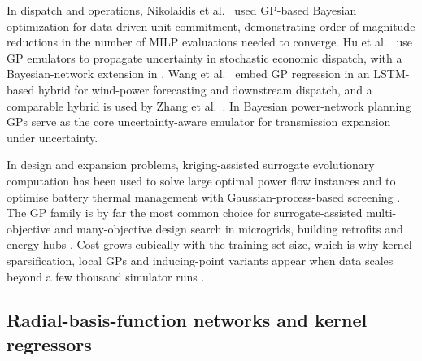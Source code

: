 In dispatch and operations, Nikolaidis et
al.~\cite{Nikolaidis2021} used GP-based Bayesian optimization for
data-driven unit commitment, demonstrating order-of-magnitude
reductions in the number of MILP evaluations needed to converge.
Hu et al.~\cite{Hu2020,Hu2021671} use GP emulators to propagate
uncertainty in stochastic economic dispatch, with a Bayesian-network
extension in \cite{Volodina2022}. Wang et al.~\cite{Wang2023} embed
GP regression in an LSTM-based hybrid for wind-power forecasting and
downstream dispatch, and a comparable hybrid is used by Zhang et
al.~\cite{Zhang2019270}. In Bayesian power-network planning
\cite{Lawson201647} GPs serve as the core uncertainty-aware emulator
for transmission expansion under uncertainty.

In design and expansion problems, kriging-assisted surrogate
evolutionary computation has been used to solve large optimal power
flow instances \cite{Deng2020831} and to optimise battery thermal
management with Gaussian-process-based screening
\cite{Li2021,Babaeiyazdi2021,Kong2021}. The GP family is by far the
most common choice for surrogate-assisted multi-objective and
many-objective design search in microgrids, building retrofits and
energy hubs \cite{Wang2017,Schulte2020,Hussien20211883,Thrampoulidis2021,Roth2019214}.
Cost grows cubically with the training-set size, which is why kernel
sparsification, local GPs and inducing-point variants appear when
data scales beyond a few thousand simulator runs
\cite{Hu2020,Volodina2022,Liu20222679}.


\subsection{Radial-basis-function networks and kernel regressors}
\label{sec:tax:rbf}

